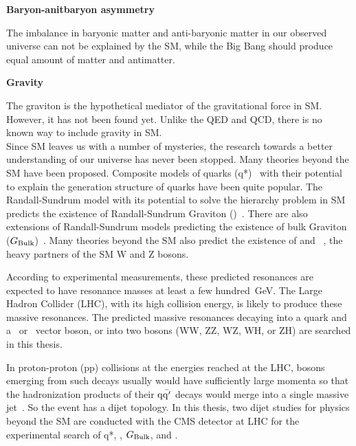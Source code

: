 {\bf Baryon-anitbaryon asymmetry }

The imbalance in baryonic matter and anti-baryonic matter in our observed universe
can not be explained by the SM, while the Big Bang should produce equal amount of 
matter and antimatter. 


{\bf Gravity}

 The graviton is the hypothetical mediator of the gravitational force in SM. However, it has not been found yet. 
 Unlike the QED and QCD, there is no known way to include gravity in SM. 
 \\
 
 
Since SM leaves us with a number of mysteries,  the research towards a better understanding of 
 our universe has never been stopped. Many theories beyond the SM have been proposed. 
 Composite models of quarks (q*)~\cite{ref_qstar, ref_qstar2} with their potential to explain the generation structure of 
quarks have been quite popular. The Randall-Sundrum model with its potential to solve the
hierarchy problem in SM predicts the existence of 
Randall-Sundrum Graviton (\GRS)~\cite{rs1,Randall:1999vf}. 
There are also extensions of Randall-Sundrum models predicting the existence of 
bulk Graviton ($G_\mathrm{Bulk}$)~\cite{GravitonWWZZ1,GravitonWWZZ2,GravitonWWZZ3}. Many theories beyond the SM also predict the existence of 
\wpr and \zpr~\cite{egm}, the heavy partners of the SM W and Z bosons. 

According to experimental measurements, these predicted resonances are expected 
to have resonance masses at least a few hundred~GeV.  The Large Hadron Collider (LHC), 
with its high collision energy, is likely to produce these massive resonances. 
The predicted massive resonances decaying into a quark and a \PW\ or \cPZ\ vector boson, or into two bosons (WW, ZZ, WZ, WH, or ZH) are searched in this thesis. 

In proton-proton (pp) collisions at the energies reached at the LHC, bosons emerging from such decays usually would have
sufficiently large momenta so that the hadronization products of their
${\rm q\bar{q'}}$ decays would merge into a single massive
jet~\cite{Gouzevitch:2013qca}. So the event has a 
dijet topology.  
In this thesis, two dijet studies for physics beyond the SM are 
conducted with the CMS detector at LHC for the experimental 
search of q*, \GRS, $G_\mathrm{Bulk}$, \wpr and \zpr.    





